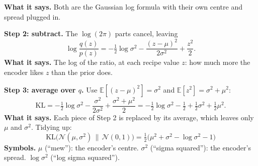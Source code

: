 \textbf{What it says.} Both are the Gaussian log formula with their own centre and spread plugged in.

\textbf{Step 2: subtract.} The $\log(2\pi)$ parts cancel, leaving
\[
\log\frac{q(z)}{p(z)} = -\tfrac{1}{2}\log\sigma^2 - \frac{(z - \mu)^2}{2\sigma^2} + \frac{z^2}{2}.
\]
\textbf{What it says.} The log of the ratio, at each recipe value $z$: how much more the encoder likes $z$ than the prior does.

\textbf{Step 3: average over $q$.} Use $\mathbb{E}[(z-\mu)^2] = \sigma^2$ and $\mathbb{E}[z^2] = \sigma^2 + \mu^2$:
\[
\mathrm{KL} = -\tfrac{1}{2}\log\sigma^2 - \frac{\sigma^2}{2\sigma^2} + \frac{\sigma^2 + \mu^2}{2}
= -\tfrac{1}{2}\log\sigma^2 - \tfrac{1}{2} + \tfrac{1}{2}\sigma^2 + \tfrac{1}{2}\mu^2.
\]
\textbf{What it says.} Each piece of Step 2 is replaced by its average, which leaves only $\mu$ and $\sigma^2$. Tidying up:
\[
\mathrm{KL}\big(\mathcal{N}(\mu, \sigma^2)\,\|\,\mathcal{N}(0,1)\big) = \tfrac{1}{2}\big(\mu^2 + \sigma^2 - \log\sigma^2 - 1\big)
\]
\textbf{Symbols.} $\mu$ (``mew''): the encoder's centre. $\sigma^2$ (``sigma squared''): the encoder's spread. $\log\sigma^2$ (``log sigma squared'').

